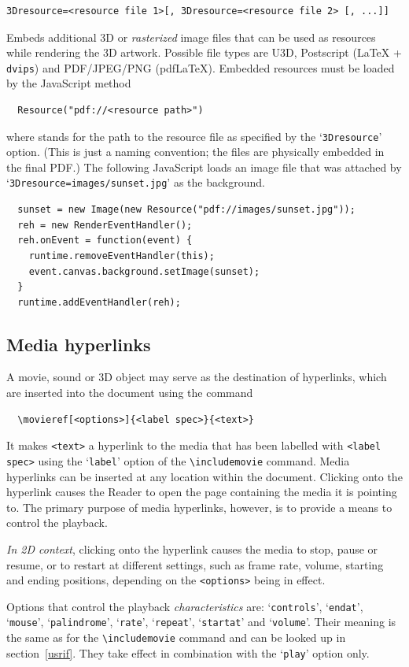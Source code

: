 \documentclass[a4paper]{article}
\begin{document}
\begin{verbatim}
3Dresource=<resource file 1>[, 3Dresource=<resource file 2> [, ...]]
\end{verbatim}
Embeds additional 3D or \emph{rasterized} image files that can be used as resources while rendering the 3D artwork. Possible file types are U3D, Postscript (\LaTeX{} + \verb+dvips+) and PDF/JPEG/PNG (pdf\LaTeX). Embedded resources must be loaded by the JavaScript method
\begin{verbatim}
  Resource("pdf://<resource path>")
\end{verbatim}
where {\tt<resource path>} stands for the path to the resource file as specified by the `\verb+3Dresource+' option. (This is just a naming convention; the files are physically embedded in the final PDF.) The following JavaScript loads an image file that was attached by `\verb+3Dresource=images/sunset.jpg+' as the background.
\begin{verbatim}
  sunset = new Image(new Resource("pdf://images/sunset.jpg")); 
  reh = new RenderEventHandler(); 
  reh.onEvent = function(event) { 
    runtime.removeEventHandler(this); 
    event.canvas.background.setImage(sunset); 
  }
  runtime.addEventHandler(reh); 
\end{verbatim}

\subsection{Media hyperlinks}\label{hyperlinks}
A movie, sound or 3D object may serve as the destination of hyperlinks, which are inserted into the document using the command
\begin{verbatim}
  \movieref[<options>]{<label spec>}{<text>}
\end{verbatim}
It makes \verb+<text>+ a hyperlink to the media that has been labelled with \verb+<label+ \verb+spec>+ using the `\verb+label+' option of the \verb+\includemovie+ command. Media hyperlinks can be inserted at any location within the document. Clicking onto the hyperlink causes the Reader to open the page containing the media it is pointing to. The primary purpose of media hyperlinks, however, is to provide a means to control the playback.

\emph{In 2D context}, clicking onto the hyperlink causes the media to stop, pause or resume, or to restart at different settings, such as frame rate, volume, starting and ending positions, depending on the \verb+<options>+ being in effect.

Options that control the playback \emph{characteristics} are: `\verb+controls+', `\verb+endat+', `\verb+mouse+', `\verb+palindrome+', `\verb+rate+', `\verb+repeat+', `\verb+startat+' and `\verb+volume+'. Their meaning is the same as for the \verb+\includemovie+ command and can be looked up in section~\ref{usrif}. They take effect in combination with the `\verb+play+' option only.
\end{document}
